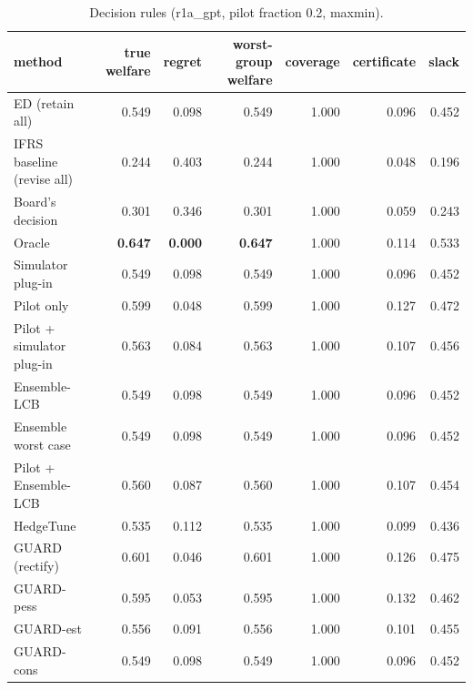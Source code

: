 \begin{table}[t]
\centering
\small
\begin{tabular}{lrrrrrr}
\toprule
method & true welfare & regret & worst-group welfare & coverage & certificate & slack \\
\midrule
ED (retain all) & 0.549 & 0.098 & 0.549 & 1.000 & 0.096 & 0.452 \\
IFRS baseline (revise all) & 0.244 & 0.403 & 0.244 & 1.000 & 0.048 & 0.196 \\
Board's decision & 0.301 & 0.346 & 0.301 & 1.000 & 0.059 & 0.243 \\
Oracle & \textbf{0.647} & \textbf{0.000} & \textbf{0.647} & 1.000 & 0.114 & 0.533 \\
Simulator plug-in & 0.549 & 0.098 & 0.549 & 1.000 & 0.096 & 0.452 \\
Pilot only & 0.599 & 0.048 & 0.599 & 1.000 & 0.127 & 0.472 \\
Pilot + simulator plug-in & 0.563 & 0.084 & 0.563 & 1.000 & 0.107 & 0.456 \\
Ensemble-LCB & 0.549 & 0.098 & 0.549 & 1.000 & 0.096 & 0.452 \\
Ensemble worst case & 0.549 & 0.098 & 0.549 & 1.000 & 0.096 & 0.452 \\
Pilot + Ensemble-LCB & 0.560 & 0.087 & 0.560 & 1.000 & 0.107 & 0.454 \\
HedgeTune & 0.535 & 0.112 & 0.535 & 1.000 & 0.099 & 0.436 \\
GUARD (rectify) & 0.601 & 0.046 & 0.601 & 1.000 & 0.126 & 0.475 \\
GUARD-pess & 0.595 & 0.053 & 0.595 & 1.000 & 0.132 & 0.462 \\
GUARD-est & 0.556 & 0.091 & 0.556 & 1.000 & 0.101 & 0.455 \\
GUARD-cons & 0.549 & 0.098 & 0.549 & 1.000 & 0.096 & 0.452 \\
\bottomrule
\end{tabular}
\caption{Decision rules (r1a\_gpt, pilot fraction 0.2, maxmin).}
\label{tab:methods-maxmin}
\end{table}
